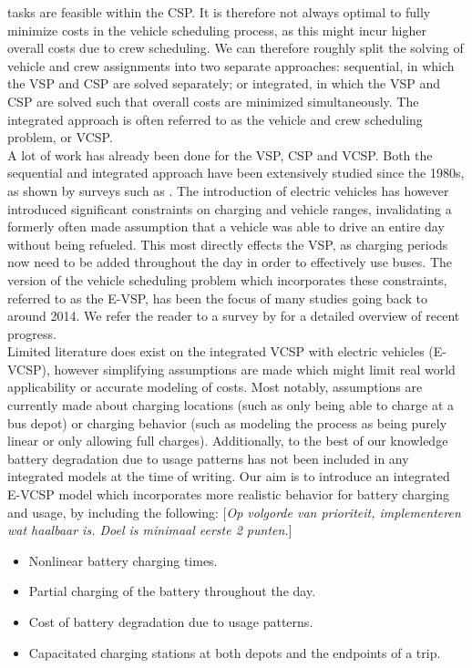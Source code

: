 \documentclass[]{article}
\newcommand{\todonocomment}[1]{{\color{red}[\textit{#1}]}}
\begin{document}
tasks are feasible within the CSP. It is therefore not always optimal to
fully minimize costs in the vehicle scheduling process, as this might incur
higher overall costs due to crew scheduling. We can therefore roughly split the
solving of vehicle and crew assignments into two separate approaches:
sequential, in which the VSP and CSP are solved separately; or integrated, in
which the VSP and CSP are solved such that overall costs are minimized
simultaneously. The integrated approach is often referred to as the vehicle and
crew scheduling problem, or VCSP. \\
A lot of work has already been done for the VSP, CSP and VCSP.
Both the sequential and integrated approach have been extensively studied since the 1980s, as shown by surveys such as \citet{Bodin1983}. The introduction of electric vehicles has however introduced significant constraints on charging and vehicle ranges, invalidating a formerly often made assumption that a vehicle was able to drive an entire day without being refueled. This most directly effects the VSP, as charging periods now need to be added throughout the day in order to
effectively use buses. The version of the vehicle scheduling problem which incorporates these constraints, referred to as the
E-VSP, has been the focus of many studies going back to around 2014. We refer the reader
to a survey by \citet{Perumal2022LitRev} for a detailed overview of recent progress. \\
Limited literature does exist on the integrated VCSP with electric vehicles (E-VCSP), however
simplifying assumptions are made which might limit real world applicability or
accurate modeling of costs. Most notably, assumptions are currently made about charging
locations (such as only being able to charge at a bus depot) or charging
behavior (such as modeling the process as being purely linear or only allowing
full charges). Additionally, to the best of our knowledge battery degradation
due to usage patterns has not been included in any integrated models at the
time of writing. Our aim is to introduce an integrated E-VCSP model which incorporates more realistic behavior for battery charging and usage, by including the following: \todonocomment{Op volgorde van prioriteit, implementeren wat haalbaar is. Doel is minimaal eerste 2 punten.}
\begin{itemize}
  \item Nonlinear battery charging times.
  \item Partial charging of the battery throughout the day.
  \item Cost of battery degradation due to usage patterns.
  \item Capacitated charging stations at both depots and the endpoints of a trip.
\end{itemize}
\end{document}
